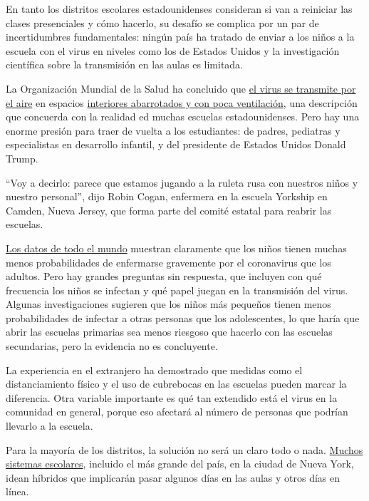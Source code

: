 En tanto los distritos escolares estadounidenses consideran si van a
reiniciar las clases presenciales y cómo hacerlo, su desafío se complica
por un par de incertidumbres fundamentales: ningún país ha tratado de
enviar a los niños a la escuela con el virus en niveles como los de
Estados Unidos y la investigación científica sobre la transmisión en las
aulas es limitada.

La Organización Mundial de la Salud ha concluido que
\href{https://slack-redir.net/link?url=https\%3A\%2F\%2Fwww.nytimes.com\%2F2020\%2F07\%2F09\%2Fhealth\%2Fvirus-aerosols-who.html}{el
virus se transmite por el aire} en espacios
\href{https://www.nytimes.com/es/2020/07/08/espanol/ciencia-y-tecnologia/coronavirus-aire-aerosoles.html}{interiores
abarrotados y con poca ventilación}, una descripción que concuerda con
la realidad ed muchas escuelas estadounidenses. Pero hay una enorme
presión para traer de vuelta a los estudiantes: de padres, pediatras y
especialistas en desarrollo infantil, y del presidente de Estados Unidos
Donald Trump.

``Voy a decirlo: parece que estamos jugando a la ruleta rusa con
nuestros niños y nuestro personal'', dijo Robin Cogan, enfermera en la
escuela Yorkship en Camden, Nueva Jersey, que forma parte del comité
estatal para reabrir las escuelas.

\href{https://www.cdc.gov/coronavirus/2019-ncov/hcp/pediatric-hcp.html\#burden-disease-risk-factors}{Los
datos de todo el mundo} muestran claramente que los niños tienen muchas
menos probabilidades de enfermarse gravemente por el coronavirus que los
adultos. Pero hay grandes preguntas sin respuesta, que incluyen con qué
frecuencia los niños se infectan y qué papel juegan en la transmisión
del virus. Algunas investigaciones sugieren que los niños más pequeños
tienen menos probabilidades de infectar a otras personas que los
adolescentes, lo que haría que abrir las escuelas primarias sea menos
riesgoso que hacerlo con las escuelas secundarias, pero la evidencia no
es concluyente.

La experiencia en el extranjero ha demostrado que medidas como el
distanciamiento físico y el uso de cubrebocas en las escuelas pueden
marcar la diferencia. Otra variable importante es qué tan extendido está
el virus en la comunidad en general, porque eso afectará al número de
personas que podrían llevarlo a la escuela.

Para la mayoría de los distritos, la solución no será un claro todo o
nada.
\href{https://bioethics.jhu.edu/research-and-outreach/projects/eschool-initiative/school-policy-tracker/}{Muchos
sistemas escolares}, incluido el más grande del país, en la ciudad de
Nueva York, idean híbridos que implicarán pasar algunos días en las
aulas y otros días en línea.

